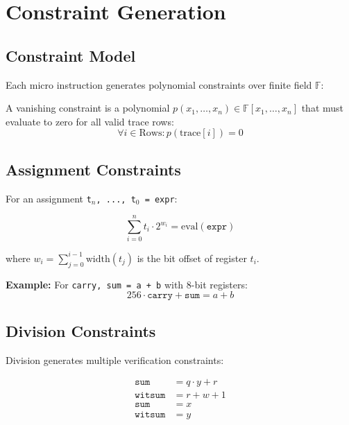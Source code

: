 \documentclass[11pt,a4paper]{article}
\begin{document}
\section{Constraint Generation}

\subsection{Constraint Model}

Each micro instruction generates polynomial constraints over finite field $\mathbb{F}$:

\begin{definition}
A vanishing constraint is a polynomial $p(x_1, \ldots, x_n) \in \mathbb{F}[x_1, \ldots, x_n]$ that must evaluate to zero for all valid trace rows:
\begin{equation}
\forall i \in \text{Rows}: p(\text{trace}[i]) = 0
\end{equation}
\end{definition}

\subsection{Assignment Constraints}

For an assignment \texttt{t$_n$, ..., t$_0$ = expr}:

\begin{equation}
\sum_{i=0}^{n} t_i \cdot 2^{w_i} = \text{eval}(\texttt{expr})
\end{equation}

where $w_i = \sum_{j=0}^{i-1} \text{width}(t_j)$ is the bit offset of register $t_i$.

\textbf{Example:} For \texttt{carry, sum = a + b} with 8-bit registers:
\begin{equation}
256 \cdot \texttt{carry} + \texttt{sum} = a + b
\end{equation}

\subsection{Division Constraints}

Division generates multiple verification constraints:

\begin{align}
\texttt{sum} &= q \cdot y + r \label{eq:div1} \\
\texttt{witsum} &= r + w + 1 \label{eq:div2} \\
\texttt{sum} &= x \label{eq:div3} \\
\texttt{witsum} &= y \label{eq:div4}
\end{align}
\end{document}
